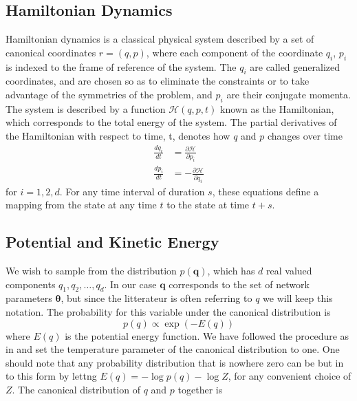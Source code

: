 \subsection{Hamiltonian Dynamics}
Hamiltonian dynamics is a classical physical system described by a set of canonical coordinates $r = (q, p)$, where each component of the coordinate $q_i$, $p_i$ is indexed to the frame of reference of the system. The $q_i$ are called generalized coordinates, and are chosen so as to eliminate the constraints or to take advantage of the symmetries of the problem, and $p_i$ are their conjugate momenta. The system is described by a function $\mathcal{H}(q,p,t)$ known as the Hamiltonian, which corresponds to the total energy of the system. The partial derivatives of the Hamiltonian with respect to time, t, denotes how $q$ and $p$ changes over time
\begin{equation}\label{eq:hamilton_equations}
\begin{split}
\frac{d q_{i}}{d t}&=\frac{\partial \mathcal{H}}{\partial p_{i}} \\
\frac{d p_{i}}{d t}&=-\frac{\partial \mathcal{H}}{\partial q_{i}}
\end{split}
\end{equation}
for $i=1,2,d$. For any time interval of duration $s$, these equations define a mapping from the state at any time $t$ to the state at time $t + s$.


\subsection{Potential and Kinetic Energy}
We wish to sample from the distribution $p(\boldsymbol{q})$, which has $d$ real valued components $q_1,q_2,\ldots,q_d$. In our case $\boldsymbol{q}$ corresponds to the set of network parameters $\boldsymbol{\theta}$, but since the litterateur is often referring to $q$ we will keep this notation. The probability for this variable under the canonical distribution is
\begin{equation*}
    p(q)\propto \exp(-E(q))
\end{equation*}
where $E(q)$ is the potential energy function. We have followed the procedure as in \cite{neal2012bayesian} and set the temperature parameter of the canonical distribution to one. One should note that any probability distribution that is nowhere zero can be but in to this form by lettng $E(q)=-\log p(q)-\log Z$, for any convenient choice of $Z$. The canonical distribution of $q$ and $p$ together is

